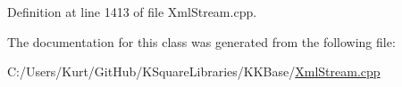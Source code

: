 Definition at line 1413 of file Xml\+Stream.\+cpp.



The documentation for this class was generated from the following file\+:\begin{DoxyCompactItemize}
\item 
C\+:/\+Users/\+Kurt/\+Git\+Hub/\+K\+Square\+Libraries/\+K\+K\+Base/\hyperlink{_xml_stream_8cpp}{Xml\+Stream.\+cpp}\end{DoxyCompactItemize}
